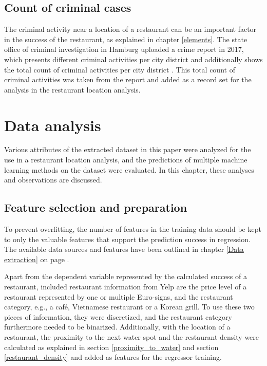 \documentclass[a4paper, 11pt, oneside]{Thesis}  %
\begin{document}
\section{Count of criminal cases}
\label{criminal_count}

The criminal activity near a location of a restaurant can be an important factor in the success of the restaurant, as explained in chapter \ref{elements}. The state office of criminal investigation in Hamburg uploaded a crime report in 2017, which presents different criminal activities per city district and additionally shows the total count of criminal activities per city district \cite{LandeskriminalamtHamburg.2017}. This total count of criminal activities was taken from the report and added as a record set for the analysis in the restaurant location analysis.

\chapter{Data analysis}
\label{data_analysis}

Various attributes of the extracted dataset in this paper were analyzed for the use in a restaurant location analysis, and the predictions of multiple machine learning methods on the dataset were evaluated. In this chapter, these analyses and observations are discussed.

\section{Feature selection and preparation}
\label{sec:Feature_selection}

To prevent overfitting, the number of features in the training data should be kept to only the valuable features that support the prediction success in regression. The available data sources and features have been outlined in chapter \ref{Data extraction} on page \pageref{Data extraction}. 

Apart from the dependent variable represented by the calculated success of a restaurant, included restaurant information from Yelp are the price level of a restaurant represented by one or multiple Euro-signs, and the restaurant category, e.g., a café, Vietnamese restaurant or a Korean grill. To use these two pieces of information, they were discretized, and the restaurant category furthermore needed to be binarized. Additionally, with the location of a restaurant, the proximity to the next water spot and the restaurant density were calculated as explained in section \ref{proximity_to_water} and section \ref{restaurant_density} and added as features for the regressor training.
\end{document}
